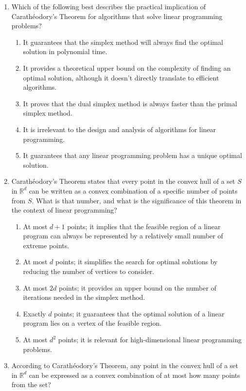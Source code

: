 \documentclass{article}%
\begin{document}
\begin{enumerate}
\vspace{1em}%
\item Which of the following best describes the practical implication of Carathéodory's Theorem for algorithms that solve linear programming problems?%
\begin{enumerate}%
\item It guarantees that the simplex method will always find the optimal solution in polynomial time.%
\item It provides a theoretical upper bound on the complexity of finding an optimal solution, although it doesn't directly translate to efficient algorithms.%
\item It proves that the dual simplex method is always faster than the primal simplex method.%
\item It is irrelevant to the design and analysis of algorithms for linear programming.%
\item It guarantees that any linear programming problem has a unique optimal solution.%
\end{enumerate}%
\vspace{1em}%
\item Carathéodory's Theorem states that every point in the convex hull of a set $S$ in $\mathbb{R}^d$ can be written as a convex combination of a specific number of points from $S$. What is that number, and what is the significance of this theorem in the context of linear programming?%
\begin{enumerate}%
\item At most $d+1$ points; it implies that the feasible region of a linear program can always be represented by a relatively small number of extreme points.%
\item At most $d$ points; it simplifies the search for optimal solutions by reducing the number of vertices to consider.%
\item At most $2d$ points; it provides an upper bound on the number of iterations needed in the simplex method.%
\item Exactly $d$ points; it guarantees that the optimal solution of a linear program lies on a vertex of the feasible region.%
\item At most $d^2$ points; it is relevant for high-dimensional linear programming problems.%
\end{enumerate}%
\vspace{1em}%
\item According to Carathéodory's Theorem, any point in the convex hull of a set in $\mathbb{R}^d$ can be expressed as a convex combination of at most how many points from the set?%

\end{enumerate}
\end{document}

